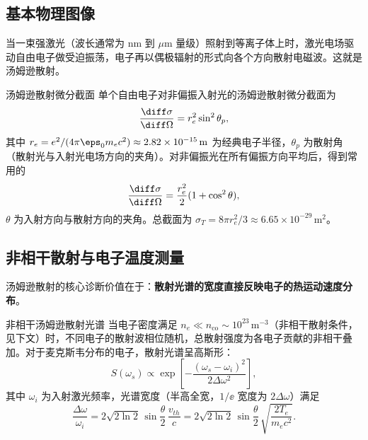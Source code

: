 \subsection{基本物理图像}

当一束强激光（波长通常为 $\mathrm{nm}$ 到 $\mu\mathrm{m}$ 量级）照射到等离子体上时，激光电场驱动自由电子做受迫振荡，电子再以偶极辐射的形式向各个方向散射电磁波。这就是汤姆逊散射。

\begin{definition}{汤姆逊散射微分截面}{}{}
单个自由电子对非偏振入射光的汤姆逊散射微分截面为
\begin{equation}
\frac{\diff\sigma}{\diff\Omega} = r_e^2 \sin^2\theta_p,
\label{eq:thomson-cross-section}
\end{equation}
其中 $r_e = e^2/(4\pi\eps_0 m_e c^2) \approx 2.82\times 10^{-15}\,\mathrm{m}$ 为经典电子半径，$\theta_p$ 为散射角（散射光与入射光电场方向的夹角）。对非偏振光在所有偏振方向平均后，得到常用的
\begin{equation}
\frac{\diff\sigma}{\diff\Omega} = \frac{r_e^2}{2}(1 + \cos^2\theta),
\label{eq:thomson-unpolarized}
\end{equation}
$\theta$ 为入射方向与散射方向的夹角。总截面为 $\sigma_T = 8\pi r_e^2/3 \approx 6.65\times 10^{-29}\,\mathrm{m}^2$。
\end{definition}

\subsection{非相干散射与电子温度测量}

汤姆逊散射的核心诊断价值在于：\textbf{散射光谱的宽度直接反映电子的热运动速度分布}。

\begin{theorem}{非相干汤姆逊散射光谱}{}{}
当电子密度满足 $n_e \ll n_{\mathrm{co}} \sim 10^{23}\,\mathrm{m}^{-3}$（非相干散射条件，见下文）时，不同电子的散射波相位随机，总散射强度为各电子贡献的非相干叠加。对于麦克斯韦分布的电子，散射光谱呈高斯形：
\begin{equation}
S(\omega_s) \propto \exp\!\left[-\frac{(\omega_s - \omega_i)^2}{2\Delta\omega^2}\right],
\label{eq:thomson-gaussian}
\end{equation}
其中 $\omega_i$ 为入射激光频率，光谱宽度（半高全宽，$1/\ee$ 宽度为 $2\Delta\omega$）满足
\begin{equation}
\frac{\Delta\omega}{\omega_i} = 2\sqrt{2\ln 2}\,\sin\frac{\theta}{2}\,\frac{v_{th}}{c}
= 2\sqrt{2\ln 2}\,\sin\frac{\theta}{2}\,\sqrt{\frac{2T_e}{m_e c^2}}.
\label{eq:thomson-width}
\end{equation}
\end{theorem}

